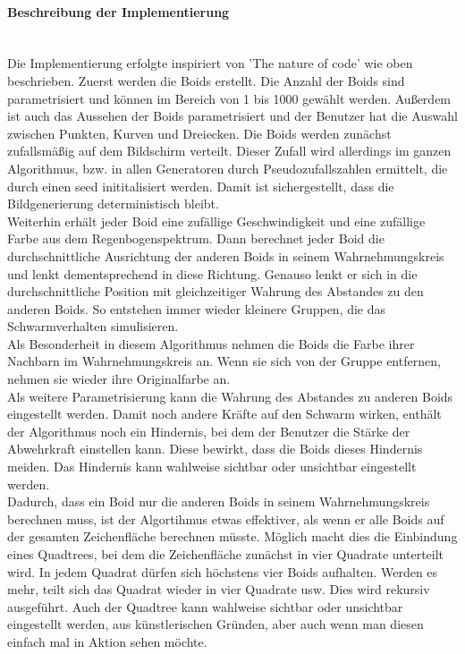 \documentclass[../mciAusarbeitung.tex]{subfiles}
\begin{document}
		\paragraph{Beschreibung der Implementierung}$~$\\
		Die Implementierung erfolgte inspiriert von 'The nature of code' \cite{shiffman2012nature} wie oben beschrieben.
		Zuerst werden die Boids erstellt. Die Anzahl der Boids sind parametrisiert und können im Bereich von 1 bis 1000 gewählt werden. Außerdem ist auch das Aussehen der Boids parametrisiert und der Benutzer hat die Auswahl zwischen Punkten, Kurven und Dreiecken. Die Boids werden zunächst zufallsmäßig auf dem Bildschirm verteilt. Dieser Zufall wird allerdings im ganzen Algorithmus, bzw. in allen Generatoren durch Pseudozufallszahlen ermittelt, die durch einen seed inititalisiert werden. Damit ist sichergestellt, dass die Bildgenerierung deterministisch bleibt.\\
		Weiterhin erhält jeder Boid eine zufällige Geschwindigkeit und eine zufällige Farbe aus dem Regenbogenspektrum. Dann berechnet jeder Boid die durchschnittliche Ausrichtung der anderen Boids in seinem Wahrnehmungskreis und lenkt dementsprechend in diese Richtung. Genauso lenkt er sich in die durchschnittliche Position mit gleichzeitiger Wahrung des Abstandes zu den anderen Boids. So entstehen immer wieder kleinere Gruppen, die das Schwarmverhalten simulisieren.\\
		Als Besonderheit in diesem Algorithmus nehmen die Boids die Farbe ihrer Nachbarn im Wahrnehmungskreis an. Wenn sie sich von der Gruppe entfernen, nehmen sie wieder ihre Originalfarbe an.\\
		Als weitere Parametrisierung kann die Wahrung des Abstandes zu anderen Boids eingestellt werden. Damit noch andere Kräfte auf den Schwarm wirken, enthält der Algorithmus noch ein Hindernis, bei dem der Benutzer die Stärke der Abwehrkraft einstellen kann. Diese bewirkt, dass die Boids dieses Hindernis meiden. Das Hindernis kann wahlweise sichtbar oder unsichtbar eingestellt werden.\\
		Dadurch, dass ein Boid nur die anderen Boids in seinem Wahrnehmungskreis berechnen muss, ist der Algortihmus etwas effektiver, als wenn er alle Boids auf der gesamten Zeichenfläche berechnen müsste. Möglich macht dies die Einbindung eines Quadtrees, bei dem die Zeichenfläche zunächst in vier Quadrate unterteilt wird. In jedem Quadrat dürfen sich höchstens vier Boids aufhalten. Werden es mehr, teilt sich das Quadrat wieder in vier Quadrate usw. Dies wird rekursiv ausgeführt. Auch der Quadtree kann wahlweise sichtbar oder unsichtbar eingestellt werden, aus künstlerischen Gründen, aber auch wenn man diesen einfach mal in Aktion sehen möchte.\\
\end{document}
